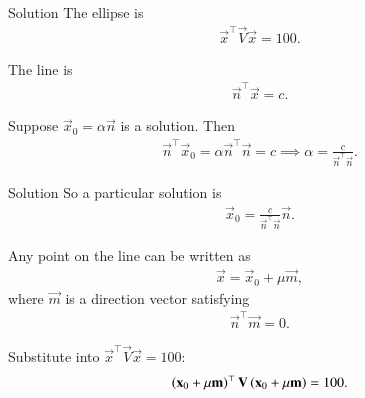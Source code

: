 \documentclass{beamer}
\begin{document}
\begin{frame}{Solution}
The ellipse is
\begin{align}
\vec{x}^\top \vec{V}\vec{x} = 100.
\end{align}

The line is
\begin{align}
\vec{n}^\top \vec{x} = c.
\end{align}

Suppose $\vec{x}_0 = \alpha \vec{n}$ is a solution.  
Then
\begin{align}
\vec{n}^\top \vec{x}_0 = \alpha \vec{n}^\top \vec{n} = c
\implies \alpha = \frac{c}{\vec{n}^\top \vec{n}}.
\end{align}
\end{frame}

\begin{frame}{Solution}
So a particular solution is
\begin{align}
\vec{x}_0 = \frac{c}{\vec{n}^\top \vec{n}} \vec{n}.
\end{align}

Any point on the line can be written as
\begin{align}
\vec{x} = \vec{x}_0 + \mu \vec{m},
\end{align}
where $\vec{m}$ is a direction vector satisfying
\begin{align}
\vec{n}^\top \vec{m} = 0.
\end{align}

Substitute into $\vec{x}^\top \vec{V}\vec{x} = 100$:
\begin{align}
\left(\mathbf{x}_0 + \mu \mathbf{m}\right)^\top \mathbf{V} \left(\mathbf{x}_0 + \mu \mathbf{m}\right) = 100.
\end{align}
\end{frame}
\end{document}
